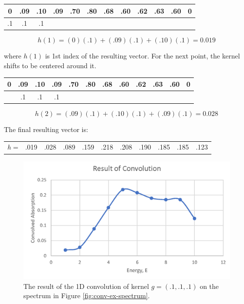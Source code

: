 \begin{table}[h!]
    \centering
    \begin{tabular}{|c|c|c|c|c|c|c|c|c|c|c|c|}
    \hline
    0  & .09 & .10 & .09 & .70 & \multicolumn{1}{c|}{.80} & \multicolumn{1}{c|}{.68} & \multicolumn{1}{c|}{.60} & .62 & .63 & .60 & 0 \\ \hline
    .1 & .1  & .1  &     &     &                          &                          &                          &     &     &     &   \\ \hline
    \end{tabular}
\end{table}
$$ 
h(1) = (0)(.1) + (.09)(.1) + (.10)(.1) = 0.019
$$

\noindent where $ h(1) $ is 1st index of the resulting vector. For the next point, the kernel shifts to be centered around it. 

\begin{table}[h!]
    \centering
    \begin{tabular}{|c|c|c|c|c|c|c|c|c|c|c|c|}
    \hline
    0 & .09 & .10 & .09 & .70 & \multicolumn{1}{c|}{.80} & \multicolumn{1}{c|}{.68} & \multicolumn{1}{c|}{.60} & .62 & .63 & .60 & 0 \\ \hline
      & .1  & .1  & .1  &     &                          &                          &                          &     &     &     &   \\ \hline
    \end{tabular}
\end{table}

$$ 
h(2) = (.09)(.1) + (.10)(.1) + (.09)(.1) = 0.028
$$

\noindent The final resulting vector is:

\begin{table}[h!]
    \centering
    \begin{tabular}{c|c|c|c|c|c|c|c|c|c|c|}
    \cline{2-11}
    \textit{h} = & .019 & .028 & .089 & .159 & .218 & .208 & .190 & .185 & .185 & .123 \\ \cline{2-11} 
    \end{tabular}
\end{table}

\begin{figure}[h!]
    \label{fig:conv-res-spectrum}
    \centering
    \includegraphics[width=.75\linewidth]{Chapters/Figures/conv-example-res.png}
    \caption[1D Convolution Result]{The result of the 1D convolution of kernel $ g = (.1, .1, .1) $  on the spectrum in Figure \ref{fig:conv-ex-spectrum}.}
\end{figure}

